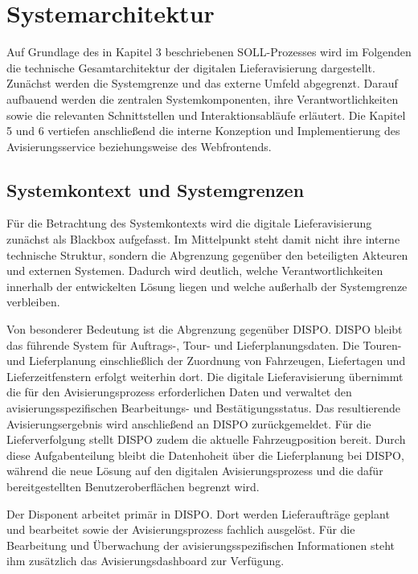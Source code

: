\documentclass[
  12pt,
  a4paper,
  oneside
]{article}
\begin{document}
\tableofcontents
\clearpage

\setcounter{section}{3}

\section{Systemarchitektur}
\label{sec:systemarchitektur}

Auf Grundlage des in Kapitel 3 beschriebenen SOLL-Prozesses wird im Folgenden
die technische Gesamtarchitektur der digitalen Lieferavisierung dargestellt.
Zunächst werden die Systemgrenze und das externe Umfeld abgegrenzt. Darauf
aufbauend werden die zentralen Systemkomponenten, ihre Verantwortlichkeiten
sowie die relevanten Schnittstellen und Interaktionsabläufe erläutert. Die
Kapitel 5 und 6 vertiefen anschließend die interne Konzeption und
Implementierung des Avisierungsservice beziehungsweise des Webfrontends.

\subsection{Systemkontext und Systemgrenzen}
\label{sec:systemkontext-systemgrenzen}

Für die Betrachtung des Systemkontexts wird die digitale Lieferavisierung
zunächst als Blackbox aufgefasst. Im Mittelpunkt steht damit nicht ihre interne
technische Struktur, sondern die Abgrenzung gegenüber den beteiligten Akteuren
und externen Systemen. Dadurch wird deutlich, welche Verantwortlichkeiten
innerhalb der entwickelten Lösung liegen und welche außerhalb der Systemgrenze
verbleiben.

Von besonderer Bedeutung ist die Abgrenzung gegenüber DISPO. DISPO bleibt das
führende System für Auftrags-, Tour- und Lieferplanungsdaten. Die Touren- und
Lieferplanung einschließlich der Zuordnung von Fahrzeugen, Liefertagen und
Lieferzeitfenstern erfolgt weiterhin dort. Die digitale Lieferavisierung
übernimmt die für den Avisierungsprozess erforderlichen Daten und verwaltet den
avisierungsspezifischen Bearbeitungs- und Bestätigungsstatus. Das resultierende
Avisierungsergebnis wird anschließend an DISPO zurückgemeldet. Für die
Lieferverfolgung stellt DISPO zudem die aktuelle Fahrzeugposition bereit. Durch
diese Aufgabenteilung bleibt die Datenhoheit über die Lieferplanung bei DISPO,
während die neue Lösung auf den digitalen Avisierungsprozess und die dafür
bereitgestellten Benutzeroberflächen begrenzt wird.

Der Disponent arbeitet primär in DISPO. Dort werden Lieferaufträge geplant und
bearbeitet sowie der Avisierungsprozess fachlich ausgelöst. Für die Bearbeitung
und Überwachung der avisierungsspezifischen Informationen steht ihm zusätzlich
das Avisierungsdashboard zur Verfügung.
\end{document}
